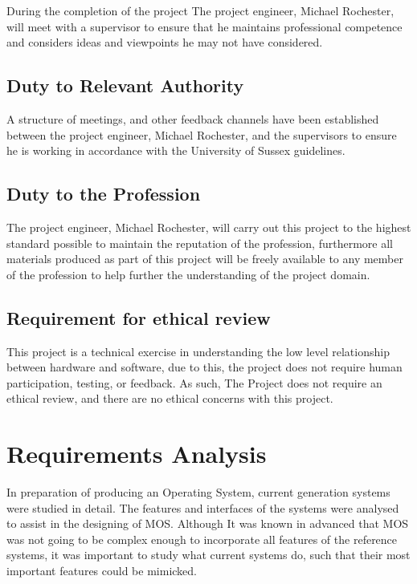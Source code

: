 \documentclass[a4paper]{report}
\begin{document}
During the completion of the project The project engineer, Michael Rochester, will meet with a supervisor to ensure that he maintains professional competence and considers ideas and viewpoints he may not have considered.

\section{Duty to Relevant Authority}

A structure of meetings, and other feedback channels have been established between the project engineer, Michael Rochester, and the supervisors to ensure he is working in accordance with the University of Sussex guidelines.

\section{Duty to the Profession}

The project engineer, Michael Rochester, will carry out this project to the highest standard possible to maintain the reputation of the profession, furthermore all materials produced as part of this project will be freely available to any member of the profession to help further the understanding of the project domain.

\section{Requirement for ethical review}

This project is a technical exercise in understanding the low level relationship between hardware and software, due to this, the project does not require human participation, testing, or feedback. As such, The Project does not require an ethical review, and there are no ethical concerns with this project.



















\chapter{Requirements Analysis}

In preparation of producing an Operating System, current generation systems were studied in detail. The features and interfaces of the systems were analysed to assist in the designing of MOS. Although It was known in advanced that MOS was not going to be complex enough to incorporate all features of the reference systems, it was important to study what current systems do, such that their most important features could be mimicked.
\end{document}
